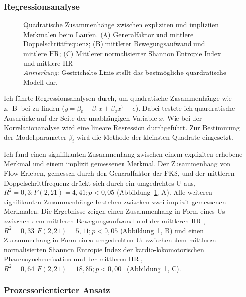 \subsubsection{Regressionsanalyse} 

\label{ssub:regressionsanalyse} 
\begin{figure}
	[!htb]  \caption[Quadratische Zusammenhänge zwischen expliziten und impliziten Merkmalen beim Laufen]{Quadratische Zusammenhänge zwischen expliziten und impliziten Merkmalen beim Laufen. (A) Generalfaktor und mittlere Doppelschrittfrequenz; (B) mittlerer Bewegungsaufwand und mittlere HR; (C) Mittlerer normalisierter Shannon Entropie Index und mittlere HR\\
	\hspace{ 
	\textwidth}\emph{Anmerkung}: Gestrichelte Linie stellt das bestmögliche quardratische Modell dar.} \label{fig:regressionsanalyse_1} 
\end{figure}

Ich führte Regressionsanalysen durch, um quadratische Zusammenhänge wie z.~B. bei \citet{Peifer2014} zu finden ($y=\beta_{0}+\beta_{1}x+\beta_{2}x^{2}+e$). Dabei testete ich quardratische Ausdrücke auf der Seite der unabhängigen Variable $x$. Wie bei der Korrelationanalyse wird eine lineare Regression durchgeführt. Zur Bestimmung der Modellparameter $\beta_i$ wird die Methode der kleinsten Quadrate eingesetzt. 

Ich fand einen signifikanten Zusammenhang zwischen einem expliziten erhobene Merkmal und einem implizit gemessenen Merkmal. Der Zusammenhang von Flow-Erleben, gemessen durch den Generalfaktor der \ac{FKS}, und der mittleren Doppelschrittfrequenz drückt sich durch ein umgedrehtes U aus, $R^2 = 0{,}3; F(2, 21) = 4{,}41; p < 0{,}05$ (Abbildung~\ref{fig:regressionsanalyse_1}, A). Alle weiteren signifikanten Zusammenhänge bestehen zwischen zwei implizit gemessenen Merkmalen. Die Ergebnisse zeigen einen Zusammenhang in Form eines Us zwischen dem mittleren Bewegungsaufwand und der mittleren HR , $R^2 = 0{,}33; F(2, 21) = 5{,}11; p < 0{,}05$ (Abbildung~\ref{fig:regressionsanalyse_1}, B) und einen Zusammenhang in Form eines umgedrehten Us zwischen dem mittleren normalisierten Shannon Entropie Index der kardio-lokomotorischen Phasensynchronisation und der mittleren HR , $R^2 = 0{,}64; F(2, 21) = 18{,}85; p < 0{,}001$ (Abbildung~\ref{fig:regressionsanalyse_1}, C).

\subsubsection{Prozessorientierter Ansatz} 

